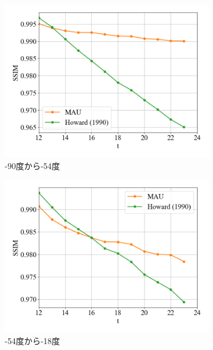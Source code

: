           \begin{figure}[htbp]
            \begin{subfigure}{0.55\textwidth}
              \centering
              \includegraphics[width=\textwidth]{figures/exp1/lng_ssim_1.png}
              \caption{-90度から-54度}
            \end{subfigure}
            \begin{subfigure}{0.5\textwidth}
              \centering
              \includegraphics[width=\textwidth]{figures/exp1/lng_ssim_2.png}
              \caption{-54度から-18度}
            \end{subfigure} \par
            \begin{subfigure}{0.5\textwidth}

\end{subfigure}
\end{figure}
